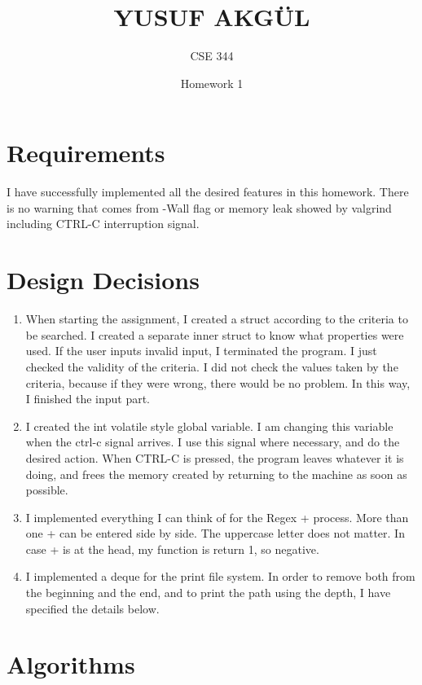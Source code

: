 \documentclass{article}
\title{YUSUF AKGÜL}
\author{CSE 344}
\date{Homework 1}
\begin{document}
\maketitle

\section{Requirements}

\setlength{\parindent}{8ex}
\hspace{\parindent} I have successfully implemented all the desired features in this homework. There is no warning that comes from -Wall flag or memory leak showed by valgrind including CTRL-C interruption signal. \par
\section{Design Decisions}

\begin{enumerate}[label=\alph*.), leftmargin=1.5\parindent]
  \item When starting the assignment, I created a struct according to the criteria to be searched. I created a separate inner struct to know what properties were used. If the user inputs invalid input, I terminated the program. I just checked the validity of the criteria. I did not check the values taken by the criteria, because if they were wrong, there would be no problem. In this way, I finished the input part.
  \item I created the int volatile style global variable. I am changing this variable when the ctrl-c signal arrives. I use this signal where necessary, and do the desired action. When CTRL-C is pressed, the program leaves whatever it is doing, and frees the memory created by returning to the machine as soon as possible.
  \item I implemented everything I can think of for the Regex + process. More than one + can be entered side by side. The uppercase letter does not matter. In case + is at the head, my function is return 1, so negative.
  \item I implemented a deque for the print file system. In order to remove both from the beginning and the end, and to print the path using the depth, I have specified the details below.
  
\end{enumerate}
\newpage
\section{Algorithms}
\end{document}
